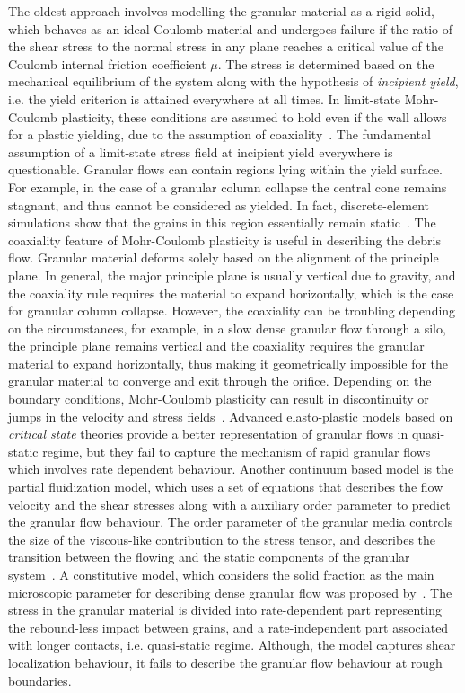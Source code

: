 The oldest approach involves modelling the granular material as a rigid solid, 
which behaves as an ideal Coulomb material and undergoes failure if the ratio 
of the shear stress to the normal stress in any plane reaches a critical value 
of the Coulomb internal friction coefficient $\mu$. The stress is determined 
based on the mechanical equilibrium of the system along with the hypothesis of 
\textit{incipient yield}, i.e. the yield criterion is attained everywhere at 
all times. In limit-state Mohr-Coulomb plasticity, these conditions are assumed 
to hold even if the wall allows for a plastic yielding, due to the assumption 
of coaxiality~\citep{Rycroft2009}. The fundamental assumption of a limit-state 
stress field at incipient yield everywhere is questionable. Granular flows can 
contain regions lying within the yield surface. For example, in the case of a 
granular column collapse the central cone remains stagnant, and thus cannot be 
considered as yielded. In fact, discrete-element simulations show that the 
grains in this region essentially remain static~\citep{Staron2005}. The 
coaxiality feature of Mohr-Coulomb plasticity is useful in describing the 
debris flow. Granular material deforms solely based on the alignment of the 
principle plane. In general, the major principle plane is usually vertical due 
to gravity, and the coaxiality rule requires the material to expand 
horizontally, which is the case for granular column collapse. However, the 
coaxiality can be troubling depending on the circumstances, for example, in a 
slow dense granular flow through a silo, the principle plane remains vertical 
and the coaxiality requires the granular material to expand horizontally, thus 
making it geometrically impossible for the granular material to converge and 
exit through the orifice. Depending on the boundary conditions, Mohr-Coulomb 
plasticity can result in discontinuity or jumps in the velocity and stress 
fields~\citep{Rycroft2006}. Advanced elasto-plastic models based on 
\textit{critical state} theories provide a better representation of granular 
flows in quasi-static regime, but they fail to capture the mechanism of rapid 
granular flows which involves rate dependent behaviour. Another continuum based 
model is the partial fluidization model, which uses a set of equations that 
describes the flow velocity and the shear stresses along with a auxiliary order 
parameter to predict the granular flow behaviour. The order parameter of the 
granular media controls the size of the viscous-like contribution to the stress 
tensor, and describes the transition between the flowing and the static 
components of the granular system~\citep{Aranson2001}. A constitutive model, 
which considers the solid fraction as the main microscopic parameter for 
describing dense granular flow was proposed by~\citet{Josserand2004}. The 
stress in the granular material is divided into rate-dependent part 
representing the rebound-less impact between grains, and a rate-independent 
part associated with longer contacts, i.e. quasi-static regime. Although, the 
model captures shear localization behaviour, it fails to describe the granular 
flow behaviour at rough boundaries.

